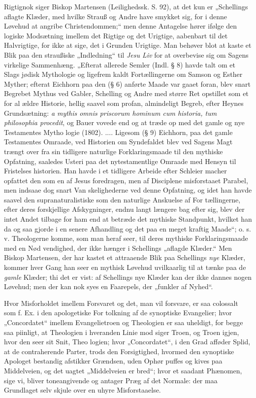 \documentclass[12pt]{book}
\newcommand{\opage}[1]{\marginnote{\footnotesize\textit{[#1]}}}
\begin{document}
Rigtignok siger Biskop Martensen (Leilighedssk. S. 92),
at det kun er „Schellings aflagte Klæder, med hvilke Strauß
og Andre have smykket sig, for i denne Løvehud at angribe
Christendommen;“ men denne Antagelse hører ifølge den
logiske Modsætning imellem det Rigtige og det Urigtige,
aabenbart til det Halvrigtige, for ikke at sige, det i Grunden
Urigtige. Man behøver blot at kaste et Blik paa den
straußiske „Indledning“ til \emph{Jesu Liv} for at overbevise sig om
Sagens virkelige Sammenhæng. „Efterat allerede Semler
(Indl. § 8) havde talt om et Slags jødisk Mythologie og
ligefrem kaldt Fortællingerne om Samson og Esther Myther;
efterat Eichhorn paa den (§ 6) anførte Maade var gaaet
foran, blev snart Begrebet Mythus ved Gabler, Schelling
\opage{53}\setcounter{footnote}{0}%
og Andre med større Ret opstillet som et for al ældre Historie,
hellig saavel som profan, almindeligt Begreb, efter Heynes
Grundsætning: \textit{a mythis omnis priscorum hominum cum
historia, tum philosophia procedit}, og Bauer vovede end\-%
og at træde op med det gamle og nye Testamentes Mytho\-%
logie (1802). .... Ligesom (§ 9) Eichhorn, paa det gamle
Testamentes Omraade, ved Historien om Syndefaldet blev
ved Sagens Magt trængt over fra sin tidligere naturlige
Forklaringsmaade til den mythiske Opfatning, saaledes Usteri
paa det nytestamentlige Omraade med Hensyn til Fristelses\-%
historien. Han havde i et tidligere Arbeide efter Schleier\-%
macher opfattet den som en af Jesus foredragen, men af
Disciplene misforstaaet Parabel, men indsaae dog snart Van\-%
skelighederne ved denne Opfatning, og idet han havde saavel
den supranaturalistiske som den naturlige Anskuelse af For\-%
tællingerne, efter deres forskjellige Afskygninger, endnu langt
længere bag efter sig, blev der intet Andet tilbage for ham
end at betræde det mythiske Standpunkt, hvilket han da og\-%
saa gjorde i en senere Afhandling og det paa en meget
kraftig Maade“; o. s. v. Theologerne komme, som man
heraf seer, til deres mythiske Forklaringsmaade med en Nød\-%
vendighed, der ikke hænger i Schellings „aflagde Klæder.“ Men
Biskop Martensen, der har kastet et attraaende Blik paa Schellings
\emph{nye} Klæder, kommer hver Gang han seer en mythisk Løvehud
uvilkaarlig til at tænke paa de \emph{gamle} Klæder; thi det er
vist: af Schellings nye Klæder kan der ikke dannes nogen
Løvehud; men der kan nok syes en Faarepels, der „funkler
af Nyhed“.

Hvor Misforholdet imellem Forsvaret og det, man vil
forsvare, er saa colossalt som f. Ex. i den apologetiske For\-%
tolkning af de synoptiske Evangelier; hvor „Concordatet“
imellem Evangelietroen og Theologien er saa uheldigt, for
begge saa piinligt, at Theologien i hveranden Linie mod\-%
siger Troen, og Troen igjen, hvor den seer sit Snit, Theo\-%
\opage{54}\setcounter{footnote}{0}%
logien; hvor „Concordatet“, i den Grad afføder Splid, at
de contraherende Parter, trods den Forsigtighed, hvormed
den synoptiske Apologet bestandig afstikker Grændsen, uden
Ophør puffes og kives paa Middelveien, og det uagtet „Middelveien
er bred“; hvor et saadant Phænomen, sige vi, bliver
toneangivende og antager Præg af det Normale: der maa
Grundlaget selv skjule over en uhyre Misforstaaelse.
\end{document}
